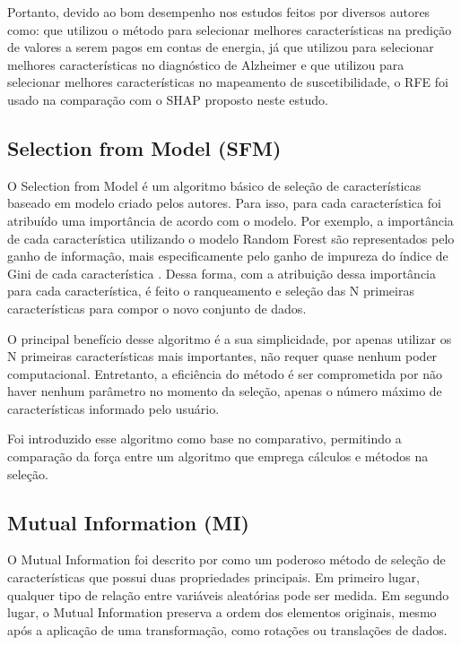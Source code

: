Portanto, devido ao bom desempenho nos estudos feitos por diversos autores como: \cite{shao2017new} que utilizou o método para selecionar melhores características na predição de valores a serem pagos em contas de energia, já \cite{richhariya2020diagnosis} que utilizou para selecionar melhores características no diagnóstico de Alzheimer e \cite{zhou2021landslide} que utilizou para selecionar melhores características no mapeamento de suscetibilidade, o RFE foi usado na comparação com o SHAP proposto neste estudo.

\subsection{Selection from Model (SFM)}

O Selection from Model é um algoritmo básico de seleção de características baseado em modelo criado pelos autores. Para isso, para cada característica foi atribuído uma importância de acordo com o modelo. Por exemplo, a importância de cada característica utilizando o modelo Random Forest são representados pelo ganho de informação, mais especificamente pelo ganho de impureza do índice de Gini de cada característica \cite{breiman1984classification}. Dessa forma, com a atribuição dessa importância para cada característica, é feito o ranqueamento e seleção das N primeiras características para compor o novo conjunto de dados.

O principal benefício desse algoritmo é a sua simplicidade, por apenas utilizar os N primeiras características mais importantes, não requer quase nenhum poder computacional. Entretanto, a eficiência do método é ser comprometida por não haver nenhum parâmetro no momento da seleção, apenas o número máximo de características informado pelo usuário.

Foi introduzido esse algoritmo como base no comparativo, permitindo a comparação da força entre um algoritmo que emprega cálculos e métodos na seleção.

\subsection{Mutual Information (MI)}

O Mutual Information foi descrito por \cite{vergara2014vergara} como um poderoso método de seleção de características que possui duas propriedades principais. Em primeiro lugar, qualquer tipo de relação entre variáveis aleatórias pode ser medida. Em segundo lugar, o Mutual Information preserva a ordem dos elementos originais, mesmo após a aplicação de uma transformação, como rotações ou translações de dados.

